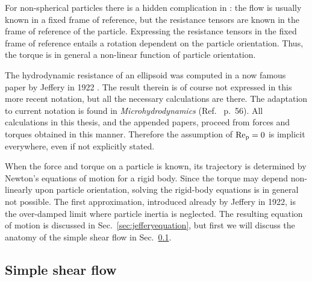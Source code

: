 \documentclass[thesis.tex]{subfiles}
\begin{document}
For non-spherical particles there is a hidden complication in : the flow is usually known in a fixed frame of reference, but the resistance tensors are known in the frame of reference of the particle. Expressing the resistance tensors in the fixed frame of reference entails a rotation dependent on the particle orientation. Thus, the torque is in general a non-linear function of particle orientation.

The hydrodynamic resistance of an ellipsoid was computed in a now famous paper by Jeffery in 1922 \cite{jeffery1922}. The result therein is of course not expressed in this more recent notation, but all the necessary calculations are there. The adaptation to current notation is found in \emph{Microhydrodynamics} (Ref.~ p.~56). All calculations in this thesis, and the appended papers, proceed from forces and torques obtained in this manner. Therefore the assumption of $\mbox{Re}_{\mathrm p} = 0$ is implicit everywhere, even if not explicitly stated.

When the force and torque on a particle is known, its trajectory is determined by Newton's equations of motion for a rigid body. Since the torque may depend non-linearly upon particle orientation, solving the rigid-body equations is in general not possible. The first approximation, introduced already by Jeffery in 1922, is the over-damped limit where particle inertia is neglected. The resulting equation of motion is discussed in Sec.~\ref{sec:jefferyequation}, but first we will discuss the anatomy of the simple shear flow in Sec.~\ref{sec:shearflow}.

\subsection{Simple shear flow}\label{sec:shearflow}
\end{document}

